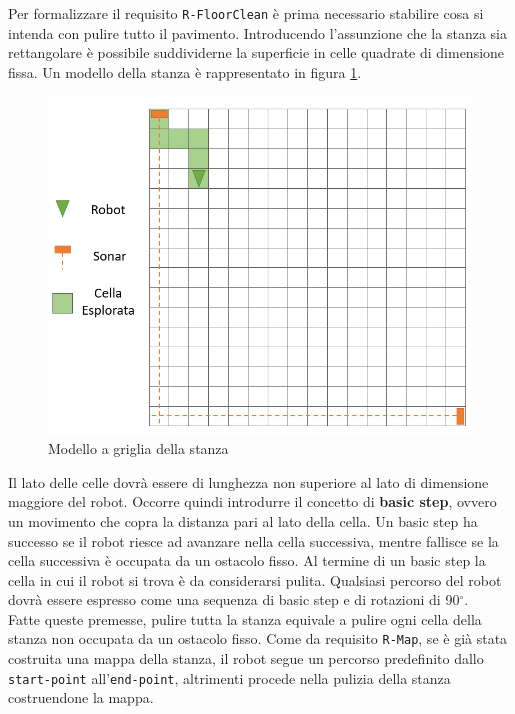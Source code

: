 \documentclass{llncs}
\newcommand{\code}[1]{{\color{blue}\small{\texttt{#1}}}}
\begin{document}
Per formalizzare il requisito \code{R-FloorClean} è prima necessario stabilire cosa si intenda con pulire tutto il pavimento. Introducendo l'assunzione che la stanza sia rettangolare è possibile suddividerne la superficie in celle quadrate di dimensione fissa. Un modello della stanza è rappresentato in figura \ref{fig:grid}. 

\begin{figure}[h!]
	\centering
	\includegraphics[scale=0.5]{img/grid.PNG}
	\caption{Modello a griglia della stanza}
	\label{fig:grid}
\end{figure}

Il lato delle celle dovrà essere di lunghezza non superiore al lato di dimensione maggiore del robot. Occorre quindi introdurre il concetto di \textbf{basic step}, ovvero un movimento che copra la distanza pari al lato della cella. Un basic step ha successo se il robot riesce ad avanzare nella cella successiva, mentre fallisce se la cella successiva è occupata da un ostacolo fisso. Al termine di un basic step la cella in cui il robot si trova è da considerarsi pulita. Qualsiasi percorso del robot dovrà essere espresso come una sequenza di basic step e di rotazioni di 90$^{\circ}$. \\ Fatte queste premesse, pulire tutta la stanza equivale a pulire ogni cella della stanza non occupata da un ostacolo fisso. Come da requisito \code{R-Map}, se è già stata costruita una mappa della stanza, il robot segue un percorso predefinito dallo \code{start-point} all'\code{end-point}, altrimenti procede nella pulizia della stanza costruendone la mappa. 
\end{document}
